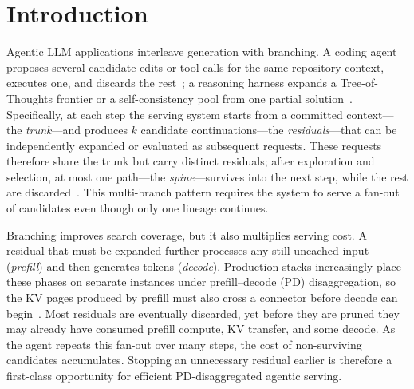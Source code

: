 \section{Introduction}
\label{sec:intro}

Agentic LLM applications interleave generation with branching.
A coding agent proposes several candidate edits or tool calls for the same repository context, executes one, and discards the rest~\cite{react,sweagent,openhands}; a reasoning harness expands a Tree-of-Thoughts frontier or a self-consistency pool from one partial solution~\cite{tot,selfconsistency,cot}.
Specifically, at each step the serving system starts from a committed context---the \emph{trunk}---and produces $k$ candidate continuations---the \emph{residuals}---that can be independently expanded or evaluated as subsequent requests.
These requests therefore share the trunk but carry distinct residuals; after exploration and selection, at most one path---the \emph{spine}---survives into the next step, while the rest are discarded~\cite{gsm8k,math,esc}.
This multi-branch pattern requires the system to serve a fan-out of candidates even though only one lineage continues.

Branching improves search coverage, but it also multiplies serving cost.
A residual that must be expanded further processes any still-uncached input (\emph{prefill}) and then generates tokens (\emph{decode}).
Production stacks increasingly place these phases on separate instances under prefill--decode (PD) disaggregation, so the KV pages produced by prefill must also cross a connector before decode can begin~\cite{distserve,splitwise}.
Most residuals are eventually discarded, yet before they are pruned they may already have consumed prefill compute, KV transfer, and some decode.
As the agent repeats this fan-out over many steps, the cost of non-surviving candidates accumulates.
Stopping an unnecessary residual earlier is therefore a first-class opportunity for efficient PD-disaggregated agentic serving.

